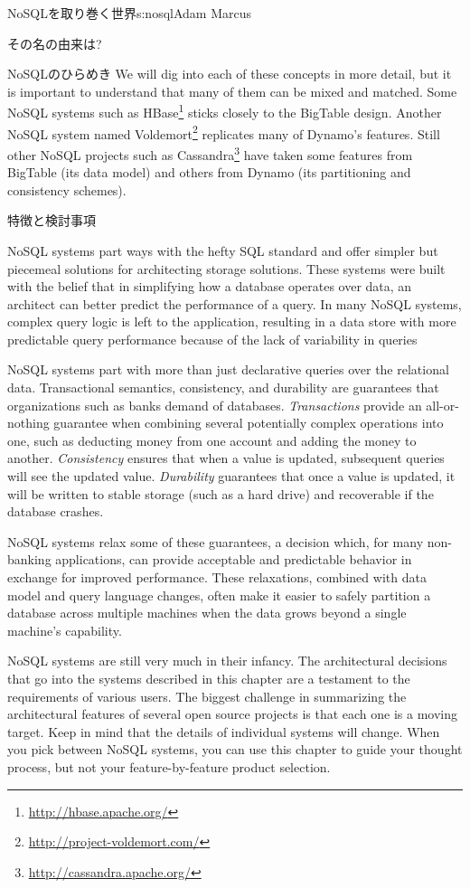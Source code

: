 \begin{aosachapter}{NoSQLを取り巻く世界}{s:nosql}{Adam Marcus}
\begin{aosasect1}{その名の由来は?}
\begin{aosasect2}{NoSQLのひらめき}
We will dig into each of these concepts in more detail, but it is
important to understand that many of them can be mixed and matched.
Some NoSQL systems such as HBase\footnote{\url{http://hbase.apache.org/}} sticks closely to the BigTable
design. Another NoSQL system named Voldemort\footnote{\url{http://project-voldemort.com/}} replicates many of
Dynamo's features.  Still other NoSQL projects such as Cassandra\footnote{\url{http://cassandra.apache.org/}} have
taken some features from BigTable (its data model) and others from
Dynamo (its partitioning and consistency schemes).

\end{aosasect2}

\begin{aosasect2}{特徴と検討事項}

NoSQL systems part ways with the hefty SQL standard and offer simpler
but piecemeal solutions for architecting storage solutions.  These
systems were built with the belief that in simplifying how a database
operates over data, an architect can better predict the performance of
a query.  In many NoSQL systems, complex query logic is left to the
application, resulting in a data store with more predictable query
performance because of the lack of variability in queries

NoSQL systems part with more than just declarative queries over the
relational data.  Transactional semantics, consistency, and durability
are guarantees that organizations such as banks demand of databases.
\emph{Transactions} provide an all-or-nothing guarantee when combining
several potentially complex operations into one, such as deducting
money from one account and adding the money to another.  \emph{Consistency}
ensures that when a value is updated, subsequent queries will see the
updated value.  \emph{Durability} guarantees that once a value is updated, it
will be written to stable storage (such as a hard drive) and
recoverable if the database crashes.

NoSQL systems relax some of these guarantees, a decision which, for
many non-banking applications, can provide acceptable and predictable
behavior in exchange for improved performance.  These relaxations,
combined with data model and query language changes, often make it
easier to safely partition a database across multiple machines when
the data grows beyond a single machine's capability.

NoSQL systems are still very much in their infancy.  The architectural
decisions that go into the systems described in this chapter are a
testament to the requirements of various users.  The biggest
challenge in summarizing the architectural features of several open
source projects is that each one is a moving target.  Keep in mind
that the details of individual systems will change. When you pick
between NoSQL systems, you can use this chapter to guide your thought
process, but not your feature-by-feature product selection.


\end{aosasect2}
\end{aosasect1}
\end{aosachapter}
